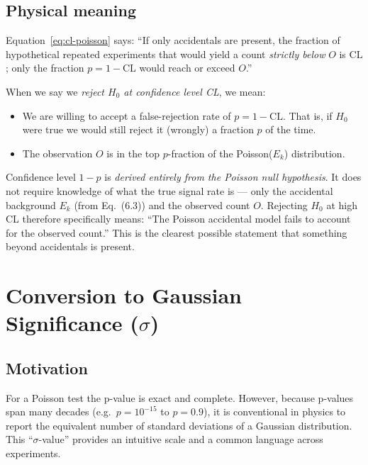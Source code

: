 \documentclass[12pt]{article}
\theoremstyle{definition}
\theoremstyle{remark}
\newenvironment{keybox}[1]{%
  \begin{tcolorbox}[colback=blue!5!white, colframe=blue!40!black,
      fonttitle=\bfseries, title={#1}, breakable]%
}{%
  \end{tcolorbox}%
}
\newcommand{\Ho}{H_0}
\newcommand{\obs}{O}
\newcommand{\Eacc}{E}
\newcommand{\nsig}{\sigma}
\begin{document}
\subsection{Physical meaning}

Equation~\eqref{eq:cl-poisson} says: ``If only accidentals are present,
the fraction of hypothetical repeated experiments that would yield a
count \emph{strictly below} $\obs$ is $\text{CL}$; only the fraction
$p = 1 - \text{CL}$ would reach or exceed $\obs$.''

When we say we \emph{reject $\Ho$ at confidence level CL}, we mean:

\begin{itemize}
  \item We are willing to accept a false-rejection rate of $p = 1 -
        \text{CL}$.  That is, if $\Ho$ were true we would still reject
        it (wrongly) a fraction $p$ of the time.
  \item The observation $\obs$ is in the top $p$-fraction of the
        Poisson($\Eacc_k$) distribution.
\end{itemize}

\begin{keybox}{Confidence and the Poisson hypothesis}
  Confidence level $1 - p$ is \emph{derived entirely from the Poisson
  null hypothesis}.  It does not require knowledge of what the true
  signal rate is — only the accidental background $\Eacc_k$ (from
  Eq.~(6.3)) and the observed count $\obs$.  Rejecting $\Ho$ at
  high CL therefore specifically means: ``The Poisson accidental model
  fails to account for the observed count.''  This is the clearest
  possible statement that something beyond accidentals is present.
\end{keybox}

\section{Conversion to Gaussian Significance ($\sigma$)}
\label{sec:sigma}

\subsection{Motivation}

For a Poisson test the p-value is exact and complete.  However, because
p-values span many decades (e.g.\ $p = 10^{-15}$ to $p = 0.9$), it is
conventional in physics to report the equivalent number of standard
deviations of a Gaussian distribution.  This ``$\nsig$-value'' provides
an intuitive scale and a common language across experiments.
\end{document}
